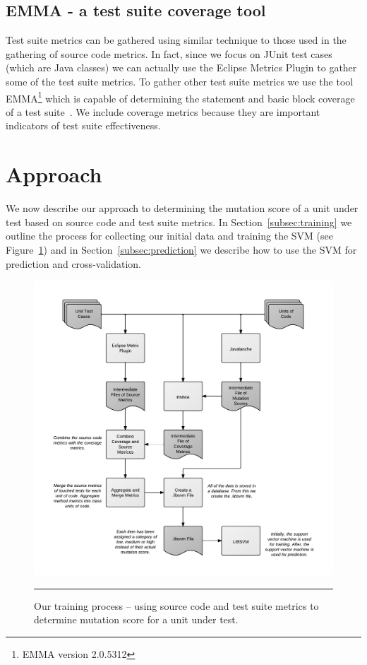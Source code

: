 \documentclass[conference]{IEEEtran}
\begin{document}
\subsection{EMMA - a test suite coverage tool}
\label{subsec:emma}
Test suite metrics can be gathered using similar technique to those used in the gathering of source code metrics. In fact, since we focus on JUnit test cases (which are Java classes) we can actually use the Eclipse Metrics Plugin to gather some of the test suite metrics. To gather other test suite metrics we use the tool EMMA\footnote{EMMA version 2.0.5312} which is capable of determining the statement and basic block coverage of a test suite~\cite{EMMA}. We include coverage metrics because they are important indicators of test suite effectiveness. 


\section{Approach}
\label{sec:approach}
We now describe our approach to determining the mutation score of a unit under test based on source code and test suite metrics. In Section~\ref{subsec:training} we outline the process for collecting our initial data and training the SVM (see Figure~\ref{fig:process}) and in Section~\ref{subsec:prediction} we describe how to use the SVM for prediction and cross-validation.

\begin{figure}[!t]
  \centering
  \includegraphics[width=13cm]{figures/process.pdf}
  \caption{Our training process -- using source code and test suite metrics to determine mutation score for a unit under test.}
  \label{fig:process}
  \vspace{2mm}
  \hrule
\end{figure}
\end{document}
